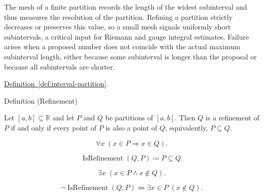 \begin{remark*}[Interpretation]
The mesh of a finite partition records the length of the widest subinterval and thus measures the resolution of the partition. Refining a partition strictly decreases or preserves this value, so a small mesh signals uniformly short subintervals, a critical input for Riemann and gauge integral estimates. Failure arises when a proposed number does not coincide with the actual maximum subinterval length, either because some subinterval is longer than the proposal or because all subintervals are shorter.
\end{remark*}

\begin{dependencies}
\hyperref[def:interval-partition]{Definition~\ref{def:interval-partition}}.
\end{dependencies}



\begin{definitionbox}{Definition (Refinement)}
\begin{definition}[Refinement]
\label{def:refinement-of-partition}
Let $[a,b] \subseteq \mathbb{R}$ and let $P$ and $Q$ be partitions of $[a,b]$. Then $Q$ is a refinement of $P$ if and only if every point of $P$ is also a point of $Q$; equivalently, $P \subseteq Q$.
\end{definition}
\end{definitionbox}

\begin{remark*}
\[
\forall x\;(x\in P \Rightarrow x\in Q).
\]
\end{remark*}

\begin{remark*}
\[
\operatorname{IsRefinement}(Q,P) \coloneqq P \subseteq Q.
\]
\end{remark*}

\begin{remark*}
\[
\exists x\;(x\in P \land x\notin Q).
\]
\end{remark*}

\begin{remark*}
\[
\neg \operatorname{IsRefinement}(Q,P) \Longleftrightarrow \exists x \in P\; (x \notin Q).
\]
\end{remark*}

